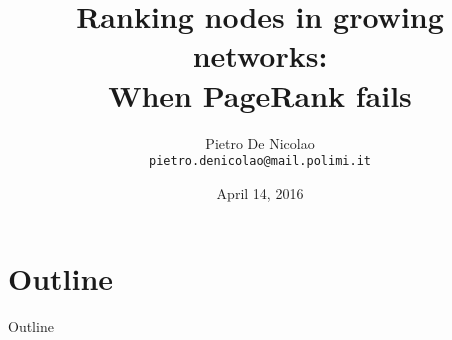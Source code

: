 \documentclass[utf8]{beamer}
\title[When PageRank fails]{Ranking nodes in growing networks: \\ When PageRank fails}
\author[De Nicolao]{Pietro De Nicolao \\ \texttt{pietro.denicolao@mail.polimi.it}}
\date{April 14, 2016}
\institute{Politecnico di Milano}
\begin{document}
\begin{frame}
    \titlepage
\end{frame}

\section*{Outline}
\begin{frame}{Outline}
    \tableofcontents
\end{frame}






\appendix

\end{document}
